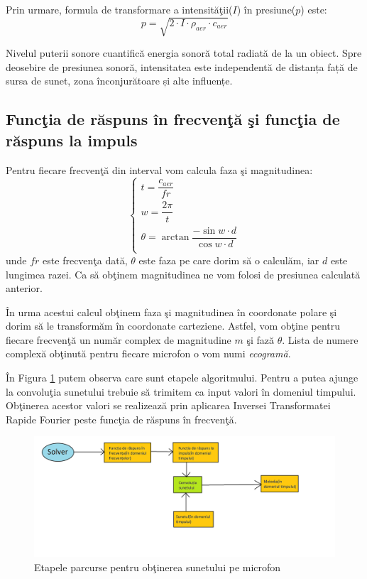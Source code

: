 	Prin urmare, formula de transformare a intensit\u{a}\c{t}ii($I$) \^{i}n presiune($p$) este:
	\begin{equation}
		p = \sqrt{2 \cdot I\cdot \rho_{aer} \cdot c_{aer}}
	\end{equation}
	\bigskip
	
	Nivelul puterii sonore cuantifică energia sonoră total radiată de la un obiect.
	Spre deosebire de presiunea sonoră, intensitatea este independentă de distanța față de sursa de sunet, zona înconjurătoare și alte influențe.

\subsection{Func\c{t}ia de r\u{a}spuns \^{i}n frecven\c{t}\u{a} \c{s}i func\c{t}ia de r\u{a}spuns la impuls}

	Pentru fiecare frecven\c{t}\u{a} din interval vom calcula faza \c{s}i magnitudinea:
	\begin{equation}
		\begin{cases}
			t = \dfrac{c_{aer}}{fr}\\
			w = \dfrac{2\pi}{t}\\
			\theta = \arctan{\dfrac{-\sin{w\cdot d}}{\cos{w\cdot d}}}\\
		\end{cases}
	\end{equation}
	unde $fr$ este frecven\c{t}a dat\u{a}, $\theta$ este faza pe care dorim s\u{a} o calcul\u{a}m, iar $d$ este lungimea razei. Ca s\u{a} ob\c{t}inem magnitudinea ne vom folosi de presiunea calculat\u{a} anterior.
	\bigskip
	
	\^{I}n urma acestui calcul ob\c{t}inem faza \c{s}i magnitudinea \^{i}n coordonate polare \c{s}i dorim s\u{a} le transform\u{a}m \^{i}n coordonate carteziene. Astfel, vom ob\c{t}ine pentru fiecare frecven\c{t}\u{a} un num\u{a}r complex de magnitudine $m$ \c{s}i faz\u{a} $\theta$. Lista de numere complex\u{a} ob\c{t}inut\u{a} pentru fiecare microfon o vom numi \textit{ecogram\u{a}}.
	\bigskip
	
	\^{I}n Figura \ref{Fig15} putem observa care sunt etapele algoritmului. Pentru a putea ajunge la convolu\c{t}ia sunetului trebuie s\u{a} trimitem ca input valori \^{i}n domeniul timpului. Ob\c{t}inerea acestor valori se realizeaz\u{a} prin aplicarea Inversei Transformatei Rapide Fourier peste func\c{t}ia de r\u{a}spuns \^{i}n frecven\c{t}\u{a}.
	\bigskip
	
	\begin{figure}[!htb]
		\centering
		\includegraphics[width=18cm]{imagini/conv.png}
		\caption{Etapele parcurse pentru ob\c{t}inerea sunetului pe microfon}
		\label{Fig15}
	\end{figure}
	
